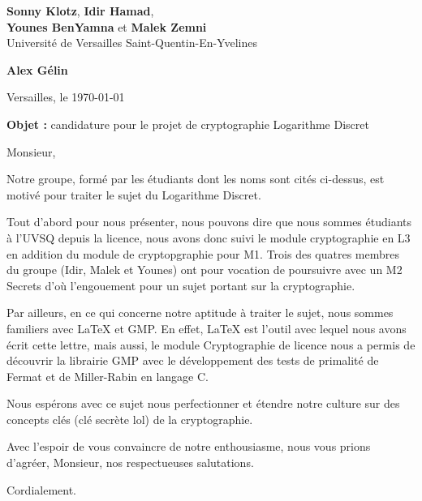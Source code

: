 \documentclass[10pt]{letter}
\begin{document}
\sffamily
	
	\begin{flushleft}
		\singlespacing
		\textbf{Sonny Klotz}, \textbf{Idir Hamad},\\ \textbf{Younes BenYamna} et \textbf{Malek Zemni}\\[.35ex]
		\footnotesize
		Université de Versailles Saint-Quentin-En-Yvelines 
	\end{flushleft}
	
	\begin{flushright}
		\singlespacing
		\textbf{Alex Gélin}\\[.35ex]
	\end{flushright}
 
	\begin{flushright}Versailles, le \today\\\end{flushright}

	\vspace{1em}
	
	\textbf{Objet :} candidature pour le projet de cryptographie \guillemotleft Logarithme Discret\guillemotright
	
	Monsieur,
	
	\hspace{1cm} Notre groupe, formé par les étudiants dont les noms sont cités ci-dessus, est motivé pour traiter le sujet du Logarithme Discret.
	
	\hspace{1cm} Tout d'abord pour nous présenter, nous pouvons dire que nous sommes étudiants à l'UVSQ depuis la licence, nous avons donc suivi le module cryptographie en L3 en addition du module de cryptopgraphie pour M1. Trois des quatres membres du groupe (Idir, Malek et Younes) ont pour vocation de poursuivre avec un M2 Secrets d'où l'engouement pour un sujet portant sur la cryptographie.
	
	\hspace{1cm} Par ailleurs, en ce qui concerne notre aptitude à traiter le sujet, nous sommes familiers avec LaTeX et GMP. En effet, LaTeX est l'outil avec lequel nous avons écrit cette lettre, mais aussi, le module Cryptographie de licence nous a permis de découvrir la librairie GMP avec le développement des tests de primalité de Fermat et de Miller-Rabin en langage C.
	
	\hspace{1cm} Nous espérons avec ce sujet nous perfectionner et étendre notre culture sur des concepts clés (clé secrète lol) de la cryptographie.
	
	\hspace{1cm} Avec l’espoir de vous convaincre de notre enthousiasme, nous vous prions d’agréer, Monsieur, nos respectueuses salutations.
	
	\begin{flushright}
		Cordialement.
	\end{flushright}
\end{document}
